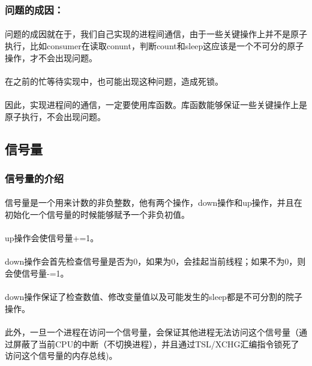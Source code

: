 \documentclass[12pt]{article}
\begin{document}
\begin{CJK}{UTF8}{gbsn}
\subsubsection{问题的成因：}
\paragraph{}问题的成因就在于，我们自己实现的进程间通信，由于一些关键操作上并不是原子执行，比如consumer在读取conunt，判断count和sleep这应该是一个不可分的原子操作，才不会出现问题。
\paragraph{}在之前的忙等待实现中，也可能出现这种问题，造成死锁。
\paragraph{}因此，实现进程间的通信，一定要使用库函数。库函数能够保证一些关键操作上是原子执行，不会出现问题。

\subsection{信号量}
\subsubsection{信号量的介绍}
\paragraph{}信号量是一个用来计数的非负整数，他有两个操作，down操作和up操作，并且在初始化一个信号量的时候能够赋予一个非负初值。
\paragraph{}up操作会使信号量+=1。
\paragraph{}down操作会首先检查信号量是否为0，如果为0，会挂起当前线程；如果不为0，则会使信号量-=1。
\paragraph{}down操作保证了检查数值、修改变量值以及可能发生的sleep都是不可分割的院子操作。
\paragraph{}此外，一旦一个进程在访问一个信号量，会保证其他进程无法访问这个信号量（通过屏蔽了当前CPU的中断（不切换进程），并且通过TSL/XCHG汇编指令锁死了访问这个信号量的内存总线)。

\end{CJK}
\end{document}

